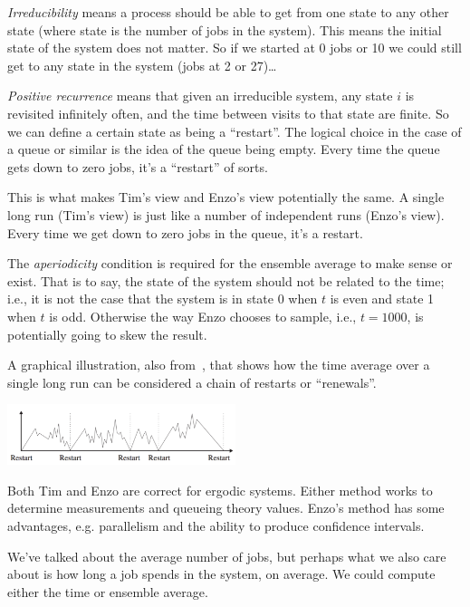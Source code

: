 \textit{Irreducibility} means a process should be able to get from one state to any other state (where state is the number of jobs in the system). This means the initial state of the system does not matter. So if we started at 0 jobs or 10 we could still get to any state in the system (jobs at 2 or 27)\ldots

\textit{Positive recurrence} means that given an irreducible system, any state $i$ is revisited infinitely often, and the time between visits to that state are finite. So we can define a certain state as being a ``restart''. The logical choice in the case of a queue or similar is the idea of the queue being empty. Every time the queue gets down to zero jobs, it's a ``restart'' of sorts. 

This is what makes Tim's view and Enzo's view potentially the same. A single long run (Tim's view) is just like a number of independent runs (Enzo's view). Every time we get down to zero jobs in the queue, it's a restart. 

The \textit{aperiodicity} condition is required for the ensemble average to make sense or exist. That is to say, the state of the system should not be related to the time; i.e., it is not the case that the system is in state 0 when $t$ is even and state 1 when $t$ is odd. Otherwise the way Enzo chooses to sample, i.e., $t = 1000$, is potentially going to skew the result.

A graphical illustration, also from~\cite{pmd}, that shows how the time average over a single long run can be considered a chain of restarts or ``renewals''.

\begin{center}
	\includegraphics[width=0.5\textwidth]{images/systemrestart.png}
\end{center}

Both Tim and Enzo are correct for ergodic systems. Either method works to determine measurements and queueing theory values. Enzo's method has some advantages, e.g. parallelism and the ability to produce confidence intervals.

We've talked about the average number of jobs, but perhaps what we also care about is how long a job spends in the system, on average. We could compute either the time or ensemble average. 

